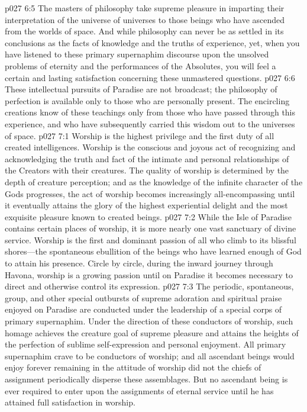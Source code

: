 \vs p027 6:5 The masters of philosophy take supreme pleasure in imparting their interpretation of the universe of universes to those beings who have ascended from the worlds of space. And while philosophy can never be as settled in its conclusions as the facts of knowledge and the truths of experience, yet, when you have listened to these primary supernaphim discourse upon the unsolved problems of eternity and the performances of the Absolutes, you will feel a certain and lasting satisfaction concerning these unmastered questions.
\vs p027 6:6 These intellectual pursuits of Paradise are not broadcast; the philosophy of perfection is available only to those who are personally present. The encircling creations know of these teachings only from those who have passed through this experience, and who have subsequently carried this wisdom out to the universes of space.
\vs p027 7:1 Worship is the highest privilege and the first duty of all created intelligences. Worship is the conscious and joyous act of recognizing and acknowledging the truth and fact of the intimate and personal relationships of the Creators with their creatures. The quality of worship is determined by the depth of creature perception; and as the knowledge of the infinite character of the Gods progresses, the act of worship becomes increasingly all\hyp{}encompassing until it eventually attains the glory of the highest experiential delight and the most exquisite pleasure known to created beings.
\pc \vs p027 7:2 While the Isle of Paradise contains certain places of worship, it is more nearly one vast sanctuary of divine service. Worship is the first and dominant passion of all who climb to its blissful shores---the spontaneous ebullition of the beings who have learned enough of God to attain his presence. Circle by circle, during the inward journey through Havona, worship is a growing passion until on Paradise it becomes necessary to direct and otherwise control its expression.
\vs p027 7:3 The periodic, spontaneous, group, and other special outbursts of supreme adoration and spiritual praise enjoyed on Paradise are conducted under the leadership of a special corps of primary supernaphim. Under the direction of these conductors of worship, such homage achieves the creature goal of supreme pleasure and attains the heights of the perfection of sublime self\hyp{}expression and personal enjoyment. All primary supernaphim crave to be conductors of worship; and all ascendant beings would enjoy forever remaining in the attitude of worship did not the chiefs of assignment periodically disperse these assemblages. But no ascendant being is ever required to enter upon the assignments of eternal service until he has attained full satisfaction in worship.
